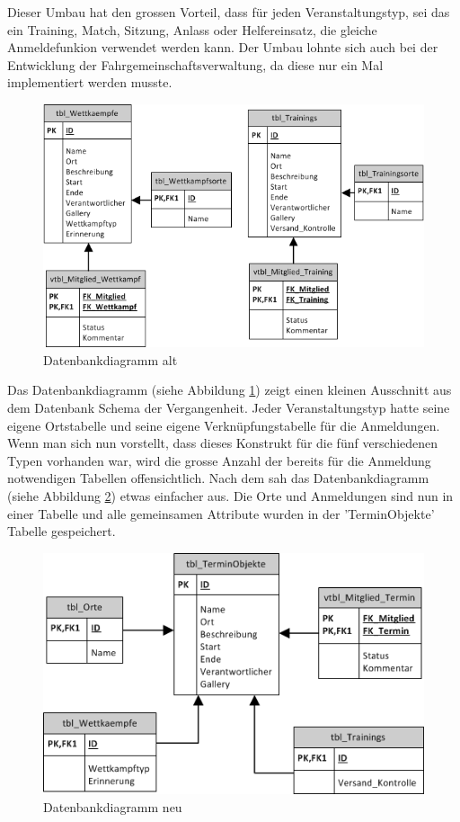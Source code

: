 Dieser Umbau hat den grossen Vorteil, dass für jeden Veranstaltungstyp, sei das ein Training, Match, Sitzung, Anlass oder Helfereinsatz, die gleiche Anmeldefunkion verwendet werden kann. Der Umbau lohnte sich auch bei der Entwicklung der Fahrgemeinschaftsverwaltung, da diese nur ein Mal implementiert werden musste.\\

\begin{figure}[h]
\centering
\includegraphics[scale=0.7]{images/visio/datenbankdiagramm_alt.png}
\caption{Datenbankdiagramm alt}
\label{fig:db_schema_alt}
\end{figure}

Das Datenbankdiagramm (siehe Abbildung \ref{fig:db_schema_alt}) zeigt einen kleinen Ausschnitt aus dem Datenbank Schema der Vergangenheit. Jeder Veranstaltungstyp hatte seine eigene Ortstabelle und seine eigene Verknüpfungstabelle für die Anmeldungen. Wenn man sich nun vorstellt, dass dieses Konstrukt für die fünf verschiedenen Typen vorhanden war, wird die grosse Anzahl der bereits für die Anmeldung notwendigen Tabellen offensichtlich. Nach dem  sah das Datenbankdiagramm (siehe Abbildung \ref{fig:db_schema_neu}) etwas einfacher aus. Die Orte und Anmeldungen sind nun in einer Tabelle und alle gemeinsamen Attribute wurden in der 'TerminObjekte' Tabelle gespeichert.

\begin{figure}[h]
\centering
\includegraphics[scale=0.7]{images/visio/datenbankdiagramm_neu.png}
\caption{Datenbankdiagramm neu}
\label{fig:db_schema_neu}
\end{figure}


